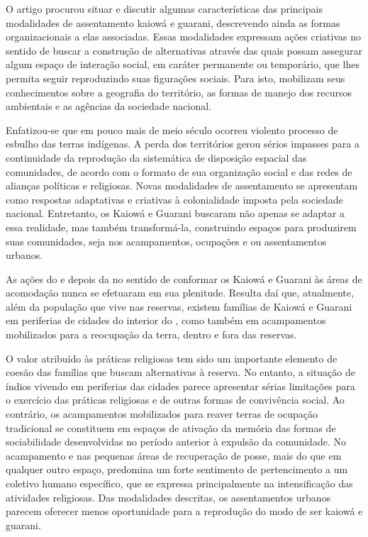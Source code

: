 {{O artigo procurou situar e discutir algumas características das
principais modalidades de assentamento kaiowá e guarani, descrevendo
ainda as formas organizacionais a elas associadas. Essas modalidades
expressam ações criativas no sentido de buscar a construção de
alternativas através das quais possam assegurar algum espaço de
interação social, em caráter permanente ou temporário, que lhes permita
seguir reproduzindo suas figurações sociais. Para isto, mobilizam seus
conhecimentos sobre a geografia do território, as formas de manejo dos
recursos ambientais e as agências da sociedade nacional. 

Enfatizou-se que em pouco mais de meio século ocorreu violento processo
de esbulho das terras indígenas. A perda dos territórios gerou sérios
impasses para a continuidade da reprodução da sistemática de disposição
espacial das comunidades, de acordo com o formato de sua organização
social e das redes de alianças políticas e religiosas. Novas
modalidades de assentamento se apresentam como respostas adaptativas e
criativas à colonialidade imposta pela sociedade nacional. Entretanto,
os Kaiowá e Guarani buscaram não apenas se adaptar a essa realidade,
mas também transformá-la, construindo espaços para produzirem suas
comunidades, seja nos acampamentos, ocupações e ou assentamentos
urbanos.

As ações do  e depois da  no sentido de conformar os Kaiowá e
Guarani às áreas de acomodação nunca se efetuaram em sua plenitude.
Resulta daí que, atualmente, além da população que vive nas reservas,
existem famílias de Kaiowá e Guarani em periferias de cidades do
interior do , como também em acampamentos mobilizados para a
reocupação da terra, dentro e fora das reservas.

O valor atribuído às práticas religiosas tem sido um importante elemento
de coesão das famílias que buscam alternativas à reserva. No entanto, a
situação de índios vivendo em periferias das cidades parece apresentar
sérias limitações para o exercício das práticas religiosas e de outras
formas de convivência social. Ao contrário, os acampamentos mobilizados
para reaver terras de ocupação tradicional se constituem em espaços de
ativação da memória das formas de sociabilidade desenvolvidas no
período anterior à expulsão da comunidade. No acampamento e nas
pequenas áreas de recuperação de posse, mais do que em qualquer outro
espaço, predomina um forte sentimento de pertencimento a um coletivo
humano específico, que se expressa principalmente na intensificação das
atividades religiosas. Das modalidades descritas, os assentamentos
urbanos parecem oferecer menos oportunidade para a reprodução do modo
de ser kaiowá e guarani. 

}}
